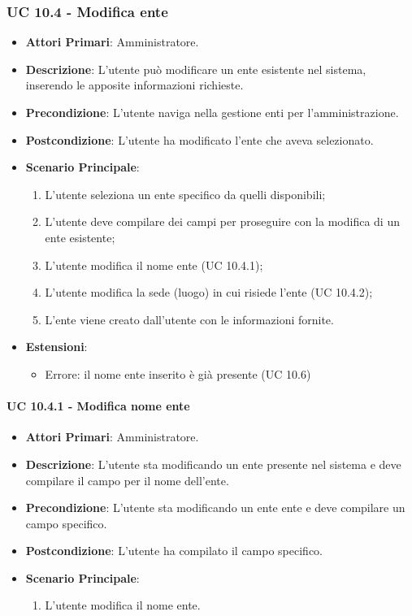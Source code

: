 			\subsubsection{UC 10.4 - Modifica ente}
			\begin{itemize}
				\item \textbf{Attori Primari}: Amministratore.
				\item \textbf{Descrizione}: L'utente può modificare un ente esistente nel sistema, inserendo le apposite informazioni richieste.
				\item \textbf{Precondizione}: L'utente naviga nella gestione enti per l'amministrazione.
				\item \textbf{Postcondizione}: L'utente ha modificato l'ente che aveva selezionato.
				\item \textbf{Scenario Principale}:
				\begin{enumerate}
					\item L'utente seleziona un ente specifico da quelli disponibili;
					\item{L'utente deve compilare dei campi per proseguire con la modifica di un ente esistente;}
					\item L'utente modifica il nome ente (UC 10.4.1);
					\item L'utente modifica la sede (luogo) in cui risiede l'ente (UC 10.4.2);
					\item{L'ente viene creato dall'utente con le informazioni fornite.}
				\end{enumerate}	
				\item \textbf{Estensioni}:
					\begin{itemize}
						\item Errore: il nome ente inserito è già presente (UC 10.6)
					\end{itemize}
			\end{itemize}	

			\paragraph{UC 10.4.1 - Modifica nome ente}
			\begin{itemize}
				\item \textbf{Attori Primari}: Amministratore.
				\item \textbf{Descrizione}: L'utente sta modificando un ente presente nel sistema e deve compilare il campo per il nome dell'ente.
				\item \textbf{Precondizione}: L'utente sta modificando un ente ente e deve compilare un campo specifico.
				\item \textbf{Postcondizione}: L'utente ha compilato il campo specifico.
				\item \textbf{Scenario Principale}:
				\begin{enumerate}
					\item L'utente modifica il nome ente.
				\end{enumerate}	
			\end{itemize}	

